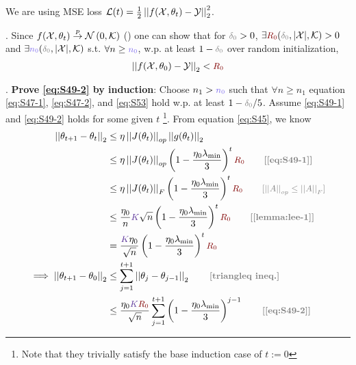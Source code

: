 \documentclass{article}
\newcommand\mc{\mathcal}
\begin{document}
\begin{appendices}
\begin{compactenum}
	\item We are using MSE loss $\mc L(t) = \onehalf \norm{\g}^2$. 
\end{compactenum}

. Since $\f \overset{p}{\to} \Gauss{0, \mc K}$ (\cite{neal1996}) one can show that for $\d > 0$, $\exists  \r(\d, |\mc X|, \mc K) > 0$ and $\exists \n(\d, |\mc X|, \mc K)$ s.t. $\forall n \geq \n$, w.p. at least $1 - \d$ over random initialization,
\begin{align}
	\norm{\g[0]} < \r \label{eq:S53}
\end{align}

. \textbf{Prove \ref{eq:S49-2} by induction}: Choose $n_1 > \n$ such that $\forall n \geq n_1$ equation \ref{eq:S47-1}, \ref{eq:S47-2}, and \ref{eq:S53} hold w.p. at least $1 - \d / 5$. Assume \ref{eq:S49-1} and \ref{eq:S49-2} holds for some given $t$ \footnote{Note that they trivially satisfy the base induction case of $t := 0$}. From equation \ref{eq:S45}, we know
\begin{align}
	\norm{\theta_{t+1} - \theta_t} 	
	&\leq \eta \norm[op]{J(\theta_t)} \norm{g(\theta_t)} \\
	&\leq \eta \norm[op]{J(\theta_t)} \lr{1 - \frac{\eta_0 \lambda_{\text{min}}}{3}}^t \r 
		\qquad \mtgray{[\ref{eq:S49-1}]} \\
	&\leq \eta \norm[F]{J(\theta_t)}  \lr{1 - \frac{\eta_0 \lambda_{\text{min}}}{3}}^t \r 
		\qquad \mgray{[\norm[op]{A} \leq \norm[F]{A}]} \\ 
	&\leq \frac{\eta_0}{n} \k \sqrt{n}  \lr{1 - \frac{\eta_0 \lambda_{\text{min}}}{3}}^t \r 
		\qquad \mtgray{[\ref{lemma:lee-1}]}  \\
	&=  \frac{\k \eta_0}{\sqrt n} \lr{1 - \frac{\eta_0 \lambda_{\text{min}}}{3}}^t \r  \\
	\implies 
	\norm{\theta_{t+1} - \theta_0}
		&\leq \sum_{j = 1}^{t+1} \norm{\theta_j - \theta_{j - 1}} 
		\qquad \mtgray{[triangleq ineq.]} \\
		&\leq \frac{\eta_0 \k \r }{\sqrt n} \sum_{j = 1}^{t+1}  \lr{1 -   \frac{\eta_0 \lambda_{\text{min}}}{3} }^{j-1} 
			\qquad \mtgray{[\ref{eq:S49-2}]}
\end{align}


\end{appendices}
\end{document}
